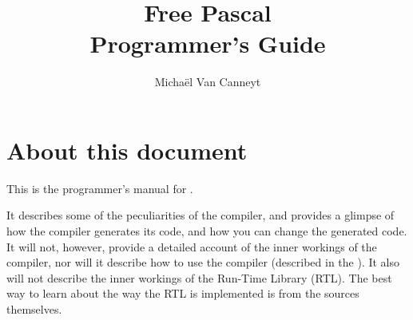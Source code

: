 %
%
%
%
%

\begin{latexonly}
  \ifpdf
  \fi
\end{latexonly}

%
%
\makeindex
{}
%
%

\title{Free Pascal \\ Programmer's Guide}

\author{Micha\"el Van Canneyt}
\maketitle
\tableofcontents
\newpage
\listoftables
\newpage

\section{About this document}
This is the programmer's manual for \fpc.

It describes some of the peculiarities of the \fpc compiler, and provides a
glimpse of how the compiler generates its code, and how you can change the
generated code. It will not, however, provide a detailed account of
the inner workings of the compiler, nor will it describe how to use the
compiler (described in the \userref). It also will not describe the inner
workings of the Run-Time Library (RTL). The best way to learn about the way
the RTL is implemented is from the sources themselves.

